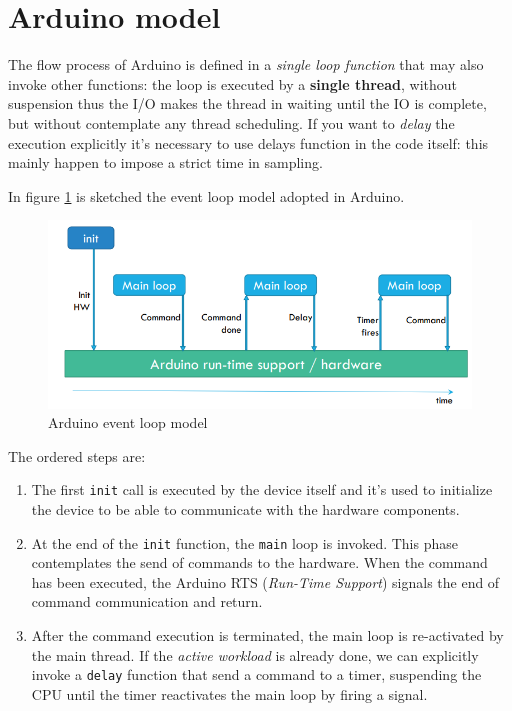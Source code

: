 \documentclass[10pt,a4paper]{report}
\theoremstyle{definition}
\begin{document}
\section{Arduino model}\label{sec:arduino-model}
The flow process of Arduino is defined in a \textit{single loop function} that may also invoke other functions: the loop is executed by a \textbf{single thread}, without suspension thus the I/O makes the thread in waiting until the IO is complete, but without contemplate any thread scheduling. If you want to \textit{delay} the execution explicitly it's necessary to use delays function in the code itself: this mainly happen to impose a strict time in sampling.

In figure \ref{arduino-event-loop} is sketched the event loop model adopted in Arduino.

\begin{figure}[b!]
	\centering\includegraphics[scale=0.50]{images/Pasted image 20230418100640.png}
	\caption{Arduino event loop model}
	\label{arduino-event-loop}
\end{figure}

The ordered steps are:
\begin{enumerate}
	\item 
	The first \texttt{init} call is executed by the device itself and it's used to initialize the device to be able to communicate with the hardware components.
	\item 
	At the end of the \texttt{init} function, the \texttt{main} loop is invoked. This phase contemplates the send of commands to the hardware. When the command has been executed, the Arduino RTS (\textit{Run-Time Support}) signals the end of command communication and return.
	\item 
	After the command execution is terminated, the main loop is re-activated by the main thread. If the \textit{active workload} is already done, we can explicitly invoke a \texttt{delay} function that send a command to a timer, suspending the CPU until the timer reactivates the main loop by firing a signal.
\end{enumerate}
\end{document}
